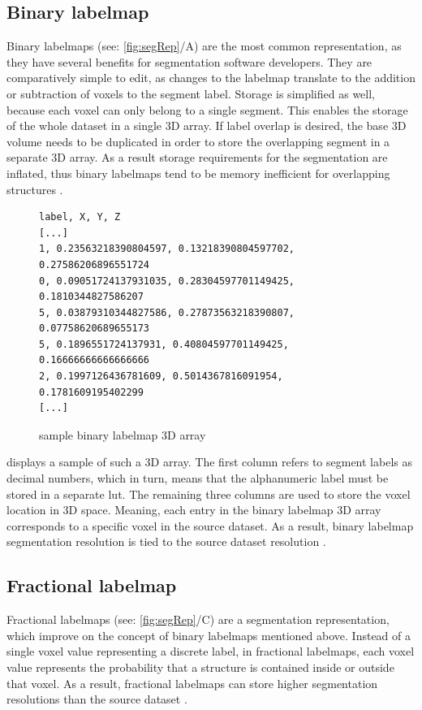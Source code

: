 \subsection{Binary labelmap}\label{s:b-binary-labelmap}
Binary labelmaps (see: \cref{fig:segRep}/A) are the most common representation, as they have several benefits for segmentation software developers.
They are comparatively simple to edit, as changes to the labelmap translate to the addition or subtraction of voxels to the segment label.
Storage is simplified as well, because each voxel can only belong to a single segment.
This enables the storage of the whole dataset in a single 3D array.
If label overlap is desired, the base 3D volume needs to be duplicated
in order to store the overlapping segment in a separate 3D array.
As a result storage requirements for the segmentation are inflated,
thus binary labelmaps tend to be memory inefficient for overlapping structures \cite{slicercommunity3DSlicerImage2022}.
\begin{figure}[h]
	\begin{verbatim}
label, X, Y, Z
[...]
1, 0.23563218390804597, 0.13218390804597702, 0.27586206896551724
0, 0.09051724137931035, 0.28304597701149425, 0.1810344827586207
5, 0.03879310344827586, 0.27873563218390807, 0.07758620689655173
5, 0.1896551724137931, 0.40804597701149425, 0.16666666666666666
2, 0.1997126436781609, 0.5014367816091954, 0.1781609195402299
[...]
\end{verbatim}
	\caption{sample binary labelmap 3D array}\label{fig:binary-array}
\end{figure}

\noindent
{} displays a sample of such a 3D array.
The first column refers to segment labels as decimal numbers,
which in turn, means that the alphanumeric label must be stored in a separate \acrfull{lut}.
The remaining three columns are used to store the voxel location in 3D space.
Meaning, each entry in the binary labelmap 3D array corresponds to a specific voxel in the source dataset.
As a result, binary labelmap segmentation resolution is tied to the source dataset resolution \cite{pinterPolymorphSegmentationRepresentation2019,sunderlandFractionalLabelmapsComputing2017,weber3DSlicerPlatform2022}.


\subsection{Fractional labelmap}\label{s:b-fractional-labelmap}
Fractional labelmaps (see: \cref{fig:segRep}/C) are a segmentation representation, which improve on the concept of binary labelmaps mentioned above.
Instead of a single voxel value representing a discrete label, in fractional labelmaps,
each voxel value represents the probability that a structure is contained inside or outside that voxel.
As a result, fractional labelmaps can store higher segmentation resolutions than the source dataset
\cite{warfieldFractionalSegmentationWhite1999,noePartialVolumeSegmentation2001,pinterPolymorphSegmentationRepresentation2019,sunderlandFractionalLabelmapsComputing2017,weber3DSlicerPlatform2022}.



